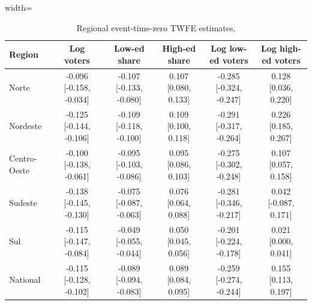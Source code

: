 \begin{table}
\caption{Regional event-time-zero TWFE estimates.}
\label{tab:regional-event-time0}
\centering
\begin{adjustbox}{width=\textwidth}
\begin{tabular}{lccccc}
\toprule
Region & Log voters & Low-ed share & High-ed share & Log low-ed voters & Log high-ed voters \\
\midrule
Norte & -0.096 [-0.158, -0.034] & -0.107 [-0.133, -0.080] & 0.107 [0.080, 0.133] & -0.285 [-0.324, -0.247] & 0.128 [0.036, 0.220] \\
Nordeste & -0.125 [-0.144, -0.106] & -0.109 [-0.118, -0.100] & 0.109 [0.100, 0.118] & -0.291 [-0.317, -0.264] & 0.226 [0.185, 0.267] \\
Centro-Oeste & -0.100 [-0.138, -0.061] & -0.095 [-0.103, -0.086] & 0.095 [0.086, 0.103] & -0.275 [-0.302, -0.248] & 0.107 [0.057, 0.158] \\
Sudeste & -0.138 [-0.145, -0.130] & -0.075 [-0.087, -0.063] & 0.076 [0.064, 0.088] & -0.281 [-0.346, -0.217] & 0.042 [-0.087, 0.171] \\
Sul & -0.115 [-0.147, -0.084] & -0.049 [-0.055, -0.044] & 0.050 [0.045, 0.056] & -0.201 [-0.224, -0.178] & 0.021 [0.000, 0.041] \\
National & -0.115 [-0.128, -0.102] & -0.089 [-0.094, -0.083] & 0.089 [0.084, 0.095] & -0.259 [-0.274, -0.244] & 0.155 [0.113, 0.197] \\
\bottomrule
\end{tabular}
\end{adjustbox}
\end{table}
